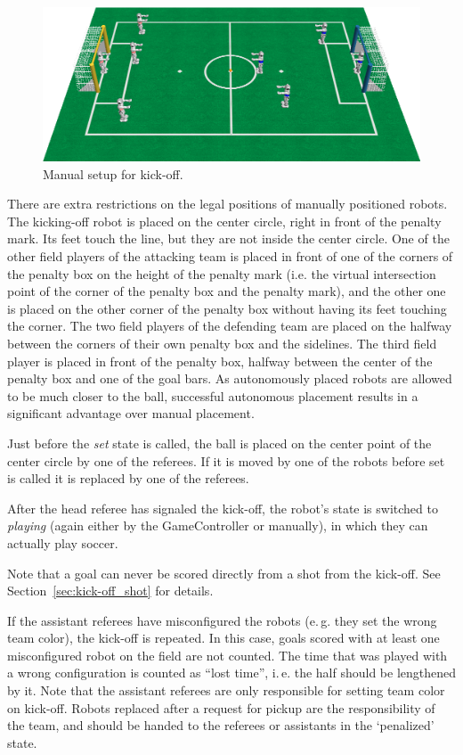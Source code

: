 \documentclass[12pt]{article}
\newcommand{\ie}{\mbox{i.\,e.}\xspace}
\newcommand{\eg}{\mbox{e.\,g.}\xspace}
\begin{document}
\begin{figure}[t]
\centerline{\includegraphics[width=\columnwidth]{figs/manual_placement_2011.png}}
\caption{Manual setup for kick-off.}
\label{fig:ko}
\end{figure}

There are extra restrictions on the legal positions of manually positioned robots. The kicking-off robot is placed on the center circle, right in front of the penalty mark. Its feet touch the line, but they are not inside the center circle. 
One of the other field players of the attacking team is placed in front of one of the corners of the penalty box on the height of the penalty mark (i.e. the virtual intersection point of the corner of the penalty box and the penalty mark), and the other one is placed on the other corner of the penalty box without having its feet touching the corner. 
The two field players of the defending team are placed on the halfway between the corners of their own penalty box and the sidelines. The third field player is placed in front of the penalty box, halfway between the center of the penalty box and one of the goal bars.
As autonomously placed robots are allowed to be much closer to the ball, successful autonomous placement results in a significant advantage over manual placement.

Just before the \emph{set} state is called, the ball is placed on the center point of the center circle by one of the referees. If it is moved by one of the robots before set is called it is replaced by one of the referees.

After the head referee has signaled the kick-off, the robot's state is switched to \emph{playing} (again either by the GameController or manually), in which they can actually play soccer.

Note that a goal can never be scored directly from a shot from the kick-off. See Section~\ref{sec:kick-off_shot} for details.

If the assistant referees have misconfigured the robots (\eg they set the wrong team color), the kick-off is repeated. In this case, goals scored with at least one misconfigured robot on the field are not counted. The time that was played with a wrong configuration is counted as ``lost time'', \ie the half should be lengthened by it. Note that the assistant referees are only responsible for setting team color on kick-off. Robots replaced after a request for pickup are the responsibility of the team, and should be handed to the referees or assistants in the `penalized' state.
\end{document}
